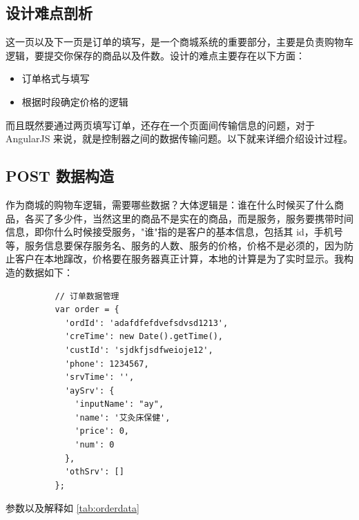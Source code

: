     \subsection{设计难点剖析}
      \label{subsec:设计难点剖析}
        这一页以及下一页是订单的填写，是一个商城系统的重要部分，主要是负责购物车逻辑，要提交你保存的商品以及件数。设计的难点主要存在以下方面：
        \begin{itemize}
          \item 订单格式与填写
          \item 根据时段确定价格的逻辑
        \end{itemize}
        而且既然要通过两页填写订单，还存在一个页面间传输信息的问题，对于 AngularJS 来说，就是控制器之间的数据传输问题。以下就来详细介绍设计过程。

    \subsection{POST 数据构造}
      \label{subsec:post_数据构造}
        作为商城的购物车逻辑，需要哪些数据？大体逻辑是：谁在什么时候买了什么商品，各买了多少件，当然这里的商品不是实在的商品，而是服务，服务要携带时间信息，即你什么时候接受服务，"谁"指的是客户的基本信息，包括其 id，手机号等，服务信息要保存服务名、服务的人数、服务的价格，价格不是必须的，因为防止客户在本地蹿改，价格要在服务器真正计算，本地的计算是为了实时显示。我构造的数据如下：
        \begin{lstlisting}
          // 订单数据管理
          var order = {
            'ordId': 'adafdfefdvefsdvsd1213',
            'creTime': new Date().getTime(),
            'custId': 'sjdkfjsdfweioje12',
            'phone': 1234567,
            'srvTime': '',
            'aySrv': {
              'inputName': "ay",
              'name': '艾灸床保健',
              'price': 0,
              'num': 0
            },
            'othSrv': []
          };
        \end{lstlisting}
        参数以及解释如 \ref{tab:orderdata}
